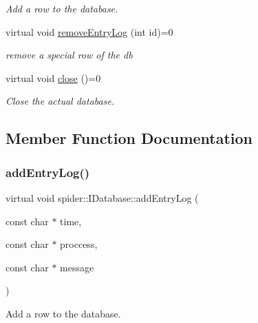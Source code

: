 \begin{DoxyCompactItemize}
\begin{DoxyCompactList}\small\item\em Add a row to the database. \end{DoxyCompactList}\item 
virtual void \hyperlink{classspider_1_1_i_database_a88a6faa9ca865e687de6f62ddb131915}{remove\+Entry\+Log} (int id)=0
\begin{DoxyCompactList}\small\item\em remove a special row of the db \end{DoxyCompactList}\item 
\mbox{\label{classspider_1_1_i_database_acc9248269c8caf08a9c54017f5e364a9}} 
virtual void \hyperlink{classspider_1_1_i_database_acc9248269c8caf08a9c54017f5e364a9}{close} ()=0
\begin{DoxyCompactList}\small\item\em Close the actual database. \end{DoxyCompactList}\end{DoxyCompactItemize}


\subsection{Member Function Documentation}
\mbox{\label{classspider_1_1_i_database_abd4a02abea860308486d908b9007a5db}} 
\subsubsection{\texorpdfstring{add\+Entry\+Log()}{addEntryLog()}}
{\footnotesize\ttfamily virtual void spider\+::\+I\+Database\+::add\+Entry\+Log (\begin{DoxyParamCaption}\item[{const char $\ast$}]{time,  }\item[{const char $\ast$}]{proccess,  }\item[{const char $\ast$}]{message }\end{DoxyParamCaption})\hspace{0.3cm}{\ttfamily [pure virtual]}}



Add a row to the database. 


